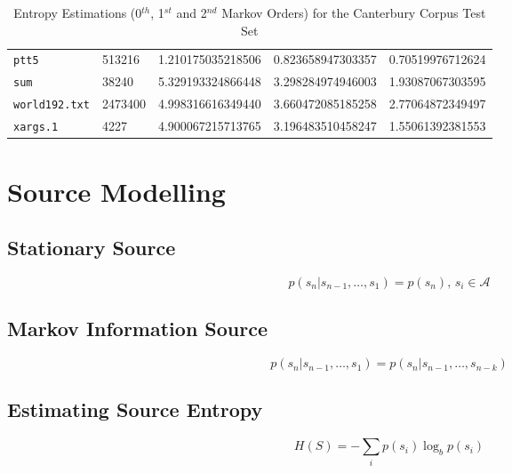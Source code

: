 \documentclass[a4paper, twocolumn]{article}
\begin{document}
\begin{table*}[t]
\begin{tabular}{lllll}
            \texttt{ptt5} & 513216 & 1.210175035218506 & 0.823658947303357 & 0.70519976712624 \\
            \texttt{sum} & 38240 & 5.329193324866448 & 3.298284974946003 & 1.93087067303595 \\
            \texttt{world192.txt} & 2473400 & 4.998316616349440 & 3.660472085185258 & 2.77064872349497 \\
            \texttt{xargs.1} & 4227 & 4.900067215713765 & 3.196483510458247 & 1.55061392381553 \\
        \bottomrule
        \end{tabular}
        \caption{Entropy Estimations (0$^{th}$, 1$^{st}$ and 2$^{nd}$ Markov Orders) for the Canterbury Corpus Test Set}
        \label{tab:canterbury}
    \end{table*}

    \section{Source Modelling} \label{sec:source_modelling}
        \subsection{Stationary Source} \label{sec:stationary_source}

        \[p(s_n | s_{n-1}, \dots, s_{1}) = p(s_n),\, s_i \in \mathcal{A}\]

        \subsection{Markov Information Source} \label{sec:markov_information_source}

        \[p(s_n | s_{n-1}, \dots, s_{1}) = p(s_n | s_{n-1}, \dots, s_{n-k})\]

        \subsection{Estimating Source Entropy} \label{sec:estimating_source_entropy}

        \begin{equation} \label{eq:entropy}
            H(S) = -\sum_i p(s_i) \log_b p(s_i)
        \end{equation}
\end{document}
